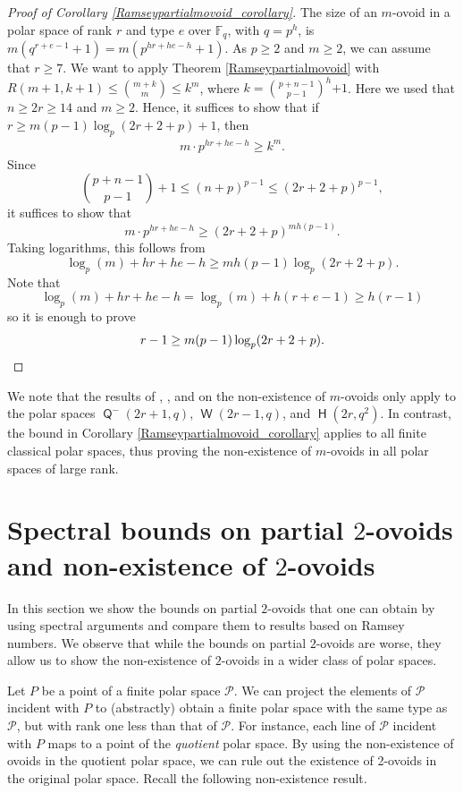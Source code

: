 \documentclass[a4paper,11pt]{amsproc}
\theoremstyle{plain}
\theoremstyle{definition}
\newcommand{\<}{\langle}
\renewcommand{\>}{\rangle} %
\DeclareMathOperator\h{\mathsf{H}}
\DeclareMathOperator\w{\mathsf{W}}
\DeclareMathOperator\q{\mathsf{Q}}
\begin{document}
\begin{proof}[Proof of Corollary \ref{Ramseypartialmovoid_corollary}]
    The size of an $m$-ovoid in a polar space of rank $r$ and type $e$ over $\mathbb{F}_q$, with $q = p^h$, is $m(q^{r + e - 1} + 1) = m(p^{hr + he - h} + 1)$.
    As $p \geq 2$ and $m \geq 2$, we can assume that $r \geq 7$.
    We want to apply Theorem \ref{Ramseypartialmovoid} with $R(m+1, k+1) \leq \binom{m+k}{m} \leq k^m$,
    where $k = \binom{p+n-1}{p-1}^h {{+ 1}}$. Here we used that $n \geq 2r \geq 14$ and $m \geq 2$.
    Hence, it suffices to show that if $r \geq m(p-1) \log_p(2r+2+p)+1$, then
    \begin{align*}
      m \cdot p^{hr + he - h} \geq k^m.
    \end{align*}
      Since
    \[
      \binom{p+n-1}{p-1} + 1\leq (n+p)^{p-1}\leq (2r+2+p)^{p-1},
    \]
    it suffices to show that
    \[
      m \cdot p^{hr+he-h} \geq (2r+2+p)^{mh(p-1)}.
    \]
    Taking logarithms, this follows from
    \[
      \log_p(m)+hr+he-h \geq mh(p-1)\log_p(2r+2+p).
    \]
    Note that 
    \[
      \log_p(m)+hr+he-h=\log_p(m)+h(r+e-1)\geq h(r-1) 
    \]
    so it is enough to prove
    \[
      r-1 \geq m(p-1) \log_p(2r+2+p).  \qedhere %
    \]
\end{proof}

We note that the results of \cite{BKLP2007}, \cite{DeBMS}, and \cite{HamiltonMathon}  on the non-existence of $m$-ovoids only apply to
the polar spaces $\q^-(2r+1,q)$, $\w(2r-1,q)$, and $\h(2r,q^2)$. In contrast, the bound in Corollary \ref{Ramseypartialmovoid_corollary} applies to all finite classical polar spaces, thus proving the non-existence of $m$-ovoids in all polar spaces of large rank. 




\section{Spectral bounds on partial \texorpdfstring{$2$}{2}-ovoids and non-existence of \texorpdfstring{$2$}{2}-ovoids}\label{sec:spectralbounds}
In this section we show the bounds on partial $2$-ovoids that one can obtain by using spectral arguments and compare them to results based on Ramsey numbers. 
We observe that while the bounds on partial $2$-ovoids are worse, they allow us to show the non-existence of $2$-ovoids in a wider class of polar spaces. 

Let $P$ be a point of a finite polar space $\mathcal{P}$. We can project the elements of $\mathcal{P}$ incident with $P$
to (abstractly) obtain a finite polar space with the same type as $\mathcal{P}$, but with rank one less than
that of $\mathcal{P}$. For instance, each line of $\mathcal{P}$ incident with $P$ maps to a point
of the \emph{quotient} polar space. By using the non-existence of ovoids in the quotient polar space,
we can rule out the existence of 2-ovoids in the original polar space.
Recall the following non-existence result. 
\end{document}
